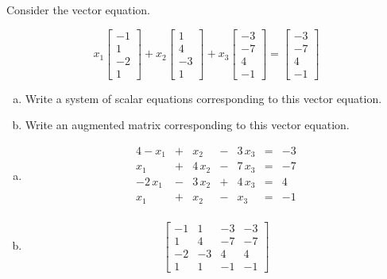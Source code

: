 
\begin{exerciseStatement}


Consider the vector equation.

\[ x_{1} \left[\begin{array}{c}
-1 \\
1 \\
-2 \\
1
\end{array}\right] + x_{2} \left[\begin{array}{c}
1 \\
4 \\
-3 \\
1
\end{array}\right] + x_{3} \left[\begin{array}{c}
-3 \\
-7 \\
4 \\
-1
\end{array}\right] = \left[\begin{array}{c}
-3 \\
-7 \\
4 \\
-1
\end{array}\right] \]
\begin{enumerate}[(a)]
\item  Write a system of scalar equations corresponding to this vector equation. 
\item  Write an augmented matrix corresponding to this vector equation. 
\end{enumerate}
    
\end{exerciseStatement}
    
\begin{exerciseAnswer} 

\begin{enumerate}[(a)]
\item 
\begin{alignat*}{4} -x_{1} &+& x_{2} &-& 3 \, x_{3} &=& -3 \\x_{1} &+& 4 \, x_{2} &-& 7 \, x_{3} &=& -7 \\-2 \, x_{1} &-& 3 \, x_{2} &+& 4 \, x_{3} &=& 4 \\x_{1} &+& x_{2} &-& x_{3} &=& -1 \\ \end{alignat*}
            
\item \[ \left[\begin{array}{ccc|c}
-1 & 1 & -3 & -3 \\
1 & 4 & -7 & -7 \\
-2 & -3 & 4 & 4 \\
1 & 1 & -1 & -1
\end{array}\right] \]
\end{enumerate}
    
\end{exerciseAnswer}
    
